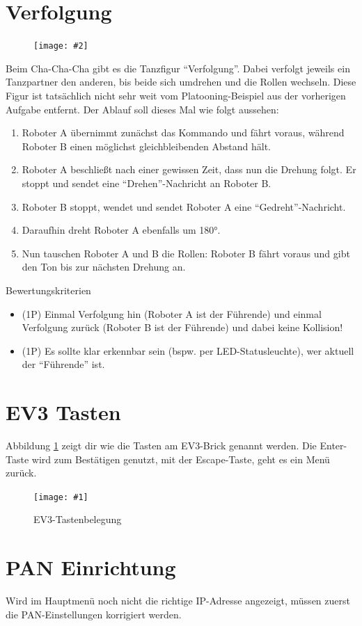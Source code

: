 \documentclass[
	12pt,
	article,
	type=bsc, %
	colorbacktitle,
	instlogo,
	accentcolor=tud1c,
	german,
	twoside
]{tudexercise}
\newcommand{\gcenter}[4]{
	\begin{figure}[h]
	\centering 
	\texttt{[image: \#1]}
	\caption{#2}
	\label{fig:#3}
	\end{figure}
}
\newcommand{\easygcenter}[2]{
	\begin{figure}[h]
	\centering 
	\texttt{[image: \#2]}
	\end{figure}
}
\begin{document}
	\section{Verfolgung}
	\easygcenter{.8\textwidth}{img/task_chachacha.png}
	Beim Cha-Cha-Cha gibt es die Tanzfigur “Verfolgung”. Dabei verfolgt jeweils ein Tanzpartner den anderen, bis beide sich umdrehen und die Rollen wechseln. Diese Figur ist tatsächlich nicht sehr weit vom Platooning-Beispiel aus der vorherigen Aufgabe entfernt.
	Der Ablauf soll dieses Mal wie folgt aussehen:
	\begin{enumerate}
	\item  Roboter A übernimmt zunächst das Kommando und fährt voraus, während Roboter B einen möglichst gleichbleibenden Abstand hält.
	\item  Roboter A beschließt nach einer gewissen Zeit, dass nun die Drehung folgt. Er stoppt und sendet eine “Drehen”-Nachricht an Roboter B.
	\item  Roboter B stoppt, wendet und sendet Roboter A eine “Gedreht”-Nachricht.
	\item  Daraufhin dreht Roboter A ebenfalls um 180°.
	\item  Nun tauschen Roboter A und B die Rollen: Roboter B fährt voraus und gibt den Ton bis zur nächsten Drehung an.
	\end{enumerate}
	Bewertungskriterien
	\begin{itemize}
	\item (1P) Einmal Verfolgung hin (Roboter A ist der Führende) und einmal Verfolgung zurück (Roboter B ist der Führende) und dabei keine Kollision!
	\item (1P) Es sollte klar erkennbar sein (bspw. per LED-Statusleuchte), wer aktuell der “Führende” ist.
	\end{itemize}
	
	\newpage
	
	\appendix
	\section{EV3 Tasten}
	Abbildung \ref{fig:buttons} zeigt dir wie die Tasten am EV3-Brick genannt werden. Die Enter-Taste wird zum Bestätigen genutzt, mit der Escape-Taste, geht es ein Menü zurück. 
		\gcenter{img/ev3_buttons.jpg}{EV3-Tastenbelegung\protect\footnotemark\ }{buttons}{.5\textwidth}
	
	\newpage
	\section{PAN Einrichtung}
	\label{sec:pan}
			Wird im Hauptmenü noch nicht die richtige IP-Adresse angezeigt, müssen zuerst die PAN-Einstellungen korrigiert werden.
		
\end{document}
